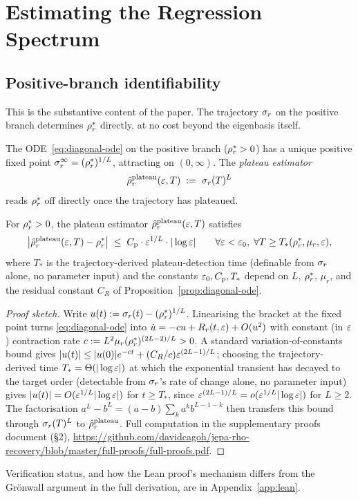\section{Estimating the Regression Spectrum}
\label{sec:estimating-spectrum}

\subsection{Positive-branch identifiability}
\label{sec:positive-branch}

This is the substantive content of the paper. The trajectory $\sigma_r$
on the positive branch determines $\rho_r^*$ directly, at no cost beyond
the eigenbasis itself.

The ODE~\eqref{eq:diagonal-ode} on the positive branch
($\rho_r^* > 0$) has a unique positive fixed point
$\sigma_r^\infty = (\rho_r^*)^{1/L}$, attracting on $(0, \infty)$. The
\emph{plateau estimator}
\begin{equation}
\label{eq:plateau-estimator}
\hat{\rho}_r^{\mathrm{plateau}}(\varepsilon, T) \;:=\; \sigma_r(T)^L
\end{equation}
reads $\rho_r^*$ off directly once the trajectory has plateaued.

\begin{proposition}
\label{prop:plateau}
For $\rho_r^* > 0$, the plateau estimator $\hat{\rho}_r^{\mathrm{plateau}}(\varepsilon, T)$
satisfies
\begin{equation}
\label{eq:plateau-bound}
\big|\hat{\rho}_r^{\mathrm{plateau}}(\varepsilon, T) - \rho_r^*\big|
\;\le\;
C_{\mathrm{p}} \cdot \varepsilon^{1/L} \cdot |\log\varepsilon|
\qquad
\forall \varepsilon < \varepsilon_0,\;\forall T \ge T_*(\rho_r^*, \mu_r, \varepsilon),
\end{equation}
where $T_*$ is the trajectory-derived plateau-detection time (definable
from $\sigma_r$ alone, no parameter input) and the constants
$\varepsilon_0, C_{\mathrm{p}}, T_*$ depend on $L$, $\rho_r^*$, $\mu_r$, and
the residual constant $C_R$ of Proposition~\ref{prop:diagonal-ode}.
\end{proposition}

\begin{proof}[Proof sketch]
Write $u(t) := \sigma_r(t) - (\rho_r^*)^{1/L}$. Linearising the bracket at the fixed point
turns \eqref{eq:diagonal-ode} into $\dot u = -cu + R_r(t,\varepsilon) + O(u^2)$ with constant
(in $\varepsilon$) contraction rate $c := L^2\mu_r(\rho_r^*)^{(2L-2)/L}>0$. A standard
variation-of-constants bound gives $|u(t)| \le |u(0)|e^{-ct} + (C_R/c)\varepsilon^{(2L-1)/L}$;
choosing the trajectory-derived time $T_*=\Theta(|\log\varepsilon|)$ at which the exponential
transient has decayed to the target order (detectable from $\sigma_r$'s rate of change
alone, no parameter input) gives $|u(t)|=O(\varepsilon^{1/L}|\log\varepsilon|)$ for $t\ge T_*$, since
$\varepsilon^{(2L-1)/L}=o(\varepsilon^{1/L}|\log\varepsilon|)$ for $L\ge2$. The factorisation
$a^L-b^L=(a-b)\sum_{k}a^kb^{L-1-k}$ then transfers this bound through $\sigma_r(T)^L$ to
$\hat{\rho}_r^{\mathrm{plateau}}$. Full computation in the supplementary proofs document (\S2),
\url{https://github.com/davidcagoh/jepa-rho-recovery/blob/master/full-proofs/full-proofs.pdf}.
\end{proof}
Verification status, and how the Lean proof's mechanism differs from the Grönwall
argument in the full derivation, are in Appendix~\ref{app:lean}.

